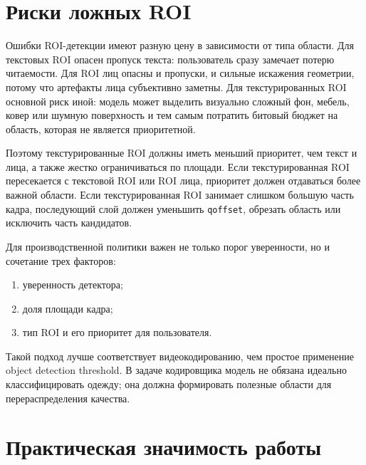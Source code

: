 \documentclass[12pt,a4paper,oneside,openany]{report}
\begin{document}

\section{Риски ложных ROI}

Ошибки ROI-детекции имеют разную цену в зависимости от типа области. Для текстовых ROI опасен пропуск текста: пользователь сразу замечает потерю читаемости. Для ROI лиц опасны и пропуски, и сильные искажения геометрии, потому что артефакты лица субъективно заметны. Для текстурированных ROI основной риск иной: модель может выделить визуально сложный фон, мебель, ковер или шумную поверхность и тем самым потратить битовый бюджет на область, которая не является приоритетной.

Поэтому текстурированные ROI должны иметь меньший приоритет, чем текст и лица, а также жестко ограничиваться по площади. Если текстурированная ROI пересекается с текстовой ROI или ROI лица, приоритет должен отдаваться более важной области. Если текстурированная ROI занимает слишком большую часть кадра, последующий слой должен уменьшить \texttt{qoffset}, обрезать область или исключить часть кандидатов.

Для производственной политики важен не только порог уверенности, но и сочетание трех факторов:
\begin{enumerate}[label=\arabic*)]
\item уверенность детектора;
\item доля площади кадра;
\item тип ROI и его приоритет для пользователя.
\end{enumerate}

Такой подход лучше соответствует видеокодированию, чем простое применение object detection threshold. В задаче кодировщика модель не обязана идеально классифицировать одежду; она должна формировать полезные области для перераспределения качества.


\section{Практическая значимость работы}
\end{document}
